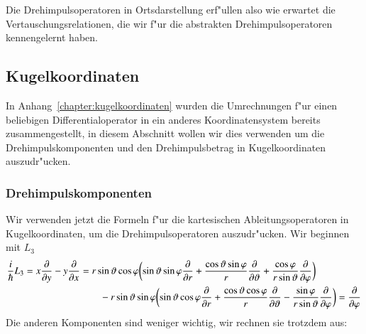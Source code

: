 Die Drehimpulsoperatoren in Ortsdarstellung erf"ullen also wie erwartet
die Vertauschungsrelationen, die wir f"ur die abstrakten Drehimpulsoperatoren
kennengelernt haben.

\subsection{Kugelkoordinaten}
In Anhang~\ref{chapter:kugelkoordinaten} wurden die Umrechnungen f"ur
einen beliebigen Differentialoperator in ein anderes Koordinatensystem
bereits zusammengestellt, in diesem Abschnitt wollen wir dies verwenden
um die Drehimpulskomponenten und den Drehimpulsbetrag in Kugelkoordinaten
auszudr"ucken.
\subsubsection{Drehimpulskomponenten}
Wir verwenden jetzt die Formeln f"ur die kartesischen Ableitungsoperatoren
in Kugelkoordinaten, um die Drehimpulsoperatoren auszudr"ucken.
Wir beginnen mit $L_3$
\begin{align}
\frac{i}{\hbar}
L_3
=
x\frac{\partial}{\partial y}
-
y\frac{\partial}{\partial x}
&=
r\sin\vartheta\cos\varphi
\biggl(
\sin\vartheta\sin\varphi
\frac{\partial}{\partial r}
+
\frac{\cos\vartheta\sin\varphi}{r}
\frac{\partial}{\partial\vartheta}
+
\frac{\cos\varphi}{r\sin\vartheta}
\frac{\partial}{\partial\varphi}
\biggr)
\notag
\\
&\qquad
-
r\sin\vartheta\sin\varphi
\biggl(
\sin\vartheta\cos\varphi
\frac{\partial}{\partial r}
+
\frac{\cos\vartheta\cos\varphi}{r}
\frac{\partial}{\partial\vartheta}
-
\frac{\sin\varphi}{r\sin\vartheta}
\frac{\partial}{\partial\varphi}
\biggr)
=
\frac{\partial}{\partial\varphi}
\label{skript:l3spherical}
\end{align}
Die anderen Komponenten sind weniger wichtig, wir rechnen sie trotzdem
aus:
